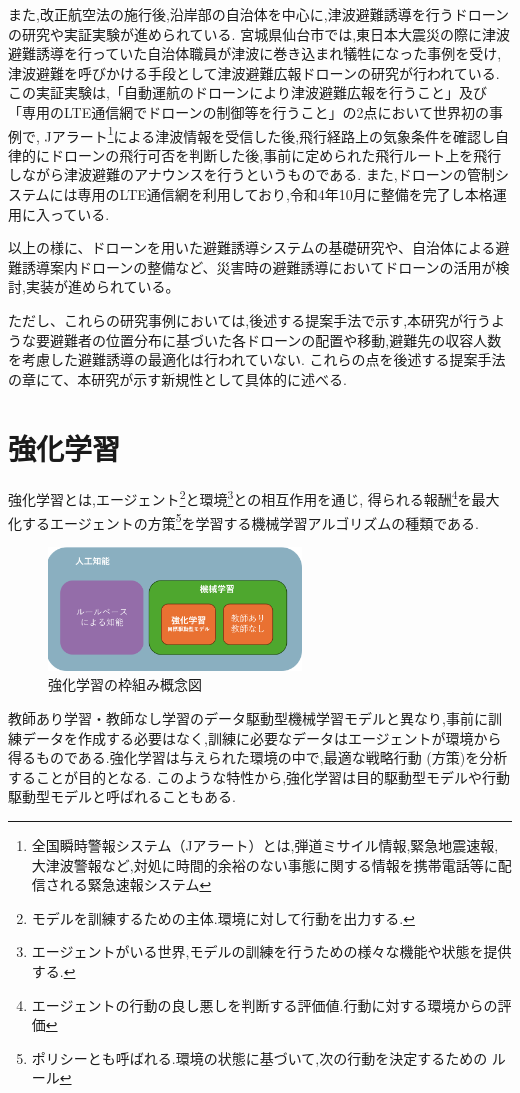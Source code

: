 また,改正航空法の施行後,沿岸部の自治体を中心に,津波避難誘導を行うドローンの研究や実証実験が進められている.
宮城県仙台市では,東日本大震災の際に津波避難誘導を行っていた自治体職員が津波に巻き込まれ犠牲になった事例を受け,津波避難を呼びかける手段として津波避難広報ドローンの研究が行われている\cite{sendai_tsunami_drone}.この実証実験は,「自動運航のドローンにより津波避難広報を行うこと」及び「専用のLTE通信網でドローンの制御等を行うこと」の2点において世界初の事例で,
Jアラート\footnote{全国瞬時警報システム（Jアラート）とは,弾道ミサイル情報,緊急地震速報,大津波警報など,対処に時間的余裕のない事態に関する情報を携帯電話等に配信される緊急速報システム}による津波情報を受信した後,飛行経路上の気象条件を確認し自律的にドローンの飛行可否を判断した後,事前に定められた飛行ルート上を飛行しながら津波避難のアナウンスを行うというものである.
また,ドローンの管制システムには専用のLTE通信網を利用しており,令和4年10月に整備を完了し本格運用に入っている.\par


以上の様に、ドローンを用いた避難誘導システムの基礎研究や、自治体による避難誘導案内ドローンの整備など、災害時の避難誘導においてドローンの活用が検討,実装が進められている。\par

ただし、これらの研究事例においては,後述する提案手法で示す,本研究が行うような要避難者の位置分布に基づいた各ドローンの配置や移動,避難先の収容人数を考慮した避難誘導の最適化は行われていない.
これらの点を後述する提案手法の章にて、本研究が示す新規性として具体的に述べる.

\section{強化学習}
強化学習とは,エージェント\footnote{モデルを訓練するための主体.環境に対して行動を出力する.}と環境\footnote{エージェントがいる世界,モデルの訓練を行うための様々な機能や状態を提供する.}との相互作用を通じ,
得られる報酬\footnote{エージェントの行動の良し悪しを判断する評価値.行動に対する環境からの評価}を最大化するエージェントの方策\footnote{ポリシーとも呼ばれる.環境の状態に基づいて,次の行動を決定するための
ルール}を学習する機械学習アルゴリズムの種類である.
\begin{figure}[H] 
  \centering 
  \includegraphics[width=0.6\textwidth]{Figures/2024-12-09 202235.png}
  \caption{強化学習の枠組み概念図} 
  \label{fig:01} 
\end{figure}
教師あり学習・教師なし学習のデータ駆動型機械学習モデルと異なり,事前に訓練データを作成する必要はなく,訓練に必要なデータはエージェントが環境から得るものである.強化学習は与えられた環境の中で,最適な戦略行動 (方策)を分析することが目的となる.
このような特性から,強化学習は目的駆動型モデルや行動駆動型モデルと呼ばれることもある.

